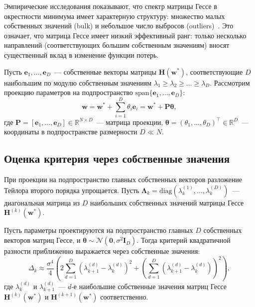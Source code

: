 Эмпирические исследования показывают, что спектр матрицы Гессе в окрестности минимума имеет характерную структуру: множество малых собственных значений (bulk) и небольшое число выбросов (outliers)~\cite{papyan2019spectrum}. Это означает, что матрица Гессе имеет низкий эффективный ранг: только несколько направлений (соответствующих большим собственным значениям) вносят существенный вклад в изменение функции потерь.

Пусть $\mathbf{e}_1, \ldots, \mathbf{e}_D$~--- собственные векторы матрицы $\mathbf{H}(\mathbf{w}^*)$, соответствующие $D$ наибольшим по модулю собственным значениям $\lambda_1 \geqslant \lambda_2 \geqslant \ldots \geqslant \lambda_D$. Рассмотрим проекцию параметров на подпространство $\text{span}\{\mathbf{e}_1, \ldots, \mathbf{e}_D\}$:
\begin{equation}
\label{eq:projection}
\mathbf{w} = \mathbf{w}^* + \sum_{i=1}^D \theta_i \mathbf{e}_i = \mathbf{w}^* + \mathbf{P} \boldsymbol{\theta},
\end{equation}
где $\mathbf{P} = [\mathbf{e}_1, \ldots, \mathbf{e}_D] \in \mathbb{R}^{N \times D}$~--- матрица проекции, $\boldsymbol{\theta} = (\theta_1, \ldots, \theta_D)^\top \in \mathbb{R}^D$~--- координаты в подпространстве размерности $D \ll N$.

\subsection{Оценка критерия через собственные значения}

При проекции на подпространство главных собственных векторов разложение Тейлора второго порядка упрощается. Пусть $\boldsymbol{\Lambda}_k = \text{diag}(\lambda_k^{(1)}, \ldots, \lambda_k^{(D)})$~--- диагональная матрица из $D$ наибольших собственных значений матрицы Гессе $\mathbf{H}^{(k)}(\mathbf{w}^*)$.

\begin{theorem}\label{th:subspace-delta}
Пусть параметры проектируются на подпространство главных $D$ собственных векторов матриц Гессе, и $\boldsymbol{\theta} \sim \mathcal{N}(\mathbf{0}, \sigma^2 \mathbf{I}_D)$. Тогда критерий квадратичной разности приближенно выражается через собственные значения:
\begin{equation}
\label{eq:delta-eigenvalues}
\Delta_k \approx \frac{\sigma^4}{4}\left(2\sum_{d=1}^D (\lambda_{k+1}^{(d)} - \lambda_k^{(d)})^2 + \left(\sum_{d=1}^D (\lambda_{k+1}^{(d)} - \lambda_k^{(d)})\right)^2\right),
\end{equation}
где $\lambda_k^{(d)}$ и $\lambda_{k+1}^{(d)}$~--- $d$-е наибольшие собственные значения матриц Гессе $\mathbf{H}^{(k)}(\mathbf{w}^*)$ и $\mathbf{H}^{(k+1)}(\mathbf{w}^*)$ соответственно.
\end{theorem}

